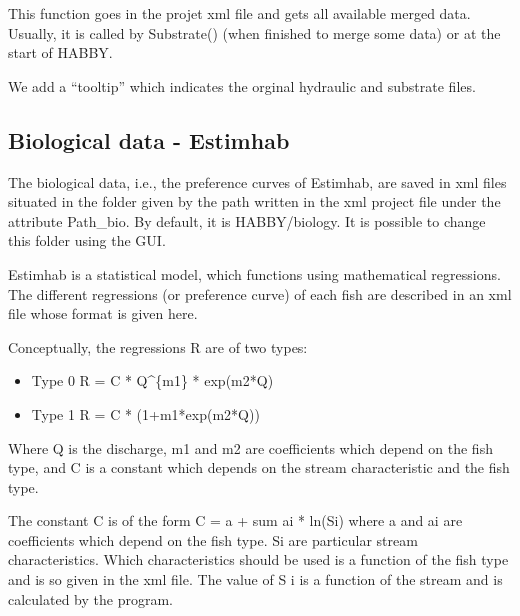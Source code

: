 \documentclass[letterpaper,10pt,english]{sphinxmanual}
\begin{document}
\begin{fulllineitems}
\begin{fulllineitems}
\end{fulllineitems}


\begin{fulllineitems}
\label{\detokenize{index:src_GUI.bio_info_GUI.BioInfo.update_merge_list}}
This function goes in the projet xml file and gets all available merged data. Usually, it is called
by Substrate() (when finished to merge some data) or at the start of HABBY.

We add a ``tooltip'' which indicates the orginal hydraulic and substrate files.

\end{fulllineitems}


\end{fulllineitems}



\subsection{Biological data - Estimhab}
\label{\detokenize{index:biological-data-estimhab}}
The biological data, i.e., the preference curves of Estimhab, are saved in xml files
situated in the folder given by the path written in the xml project file under the
attribute Path\_bio. By default, it is HABBY/biology. It is possible to change this folder
using the GUI.

Estimhab is a statistical model, which functions using mathematical regressions.
The different regressions (or preference curve) of each fish are described in an xml file
whose format is given here.

Conceptually, the regressions R are of two types:
\begin{itemize}
\item {} 
Type 0          R = C * Q\textasciicircum{}\{m1\} * exp(m2*Q)

\item {} 
Type 1          R = C * (1+m1*exp(m2*Q))

\end{itemize}

Where Q is the discharge, m1 and m2 are coefficients which depend on the fish type, and C is a
constant which depends on the stream characteristic and the fish type.

The constant C is of the form C = a + sum ai * ln(Si) where a and ai are coefficients which depend on
the fish type. Si are particular stream characteristics. Which characteristics should be used is a
function of the fish type and is so given in the xml file. The value of S i is a function of the stream
and is calculated by the program.
\end{document}
